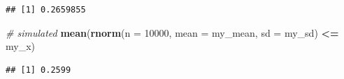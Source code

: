 \documentclass[
]{book}
\newenvironment{Shaded}{\begin{snugshade}}{\end{snugshade}}
\newcommand{\CommentTok}[1]{\textcolor[rgb]{0.56,0.35,0.01}{\textit{#1}}}
\newcommand{\DataTypeTok}[1]{\textcolor[rgb]{0.13,0.29,0.53}{#1}}
\newcommand{\DecValTok}[1]{\textcolor[rgb]{0.00,0.00,0.81}{#1}}
\newcommand{\KeywordTok}[1]{\textcolor[rgb]{0.13,0.29,0.53}{\textbf{#1}}}
\newcommand{\NormalTok}[1]{#1}
\newcommand{\OperatorTok}[1]{\textcolor[rgb]{0.81,0.36,0.00}{\textbf{#1}}}
\newcommand{\StringTok}[1]{\textcolor[rgb]{0.31,0.60,0.02}{#1}}
\begin{document}
\begin{verbatim}
## [1] 0.2659855
\end{verbatim}

\begin{Shaded}
\begin{Highlighting}[]
\CommentTok{# simulated}
\KeywordTok{mean}\NormalTok{(}\KeywordTok{rnorm}\NormalTok{(}\DataTypeTok{n =} \DecValTok{10000}\NormalTok{, }\DataTypeTok{mean =}\NormalTok{ my_mean, }\DataTypeTok{sd =}\NormalTok{ my_sd) }\OperatorTok{<=}\StringTok{ }\NormalTok{my_x)}
\end{Highlighting}
\end{Shaded}

\begin{verbatim}
## [1] 0.2599
\end{verbatim}
\end{document}
